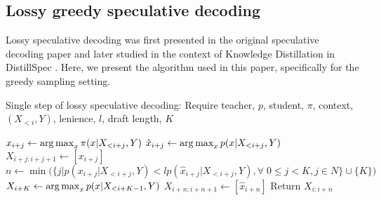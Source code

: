 \subsection{Lossy greedy speculative decoding}

Lossy speculative decoding was first presented in the original speculative decoding paper \cite{leviathan2023fast} and later studied in the context of Knowledge Distillation in DistillSpec \cite{DistllSpec}. Here, we present the algorithm used in this paper, specifically for the greedy sampling setting.

\begin{algorithm}[h!]
\caption{Single step of lossy speculative decoding: Require teacher, $p$, student, $\pi$, context, $(X_{<i}, Y)$, lenience, $l$, draft length, $K$}
\begin{algorithmic}[1]
        \State $x_{i+j} \gets \operatorname*{arg\,max}_{x} \pi(x|X_{<i + j}, Y)$
        \State $\hat{x}_{i + j} \gets \operatorname*{arg\,max}_{x} p(x|X_{<i + j}, Y)$
        \State $X_{i + j: i + j + 1} \gets [x_{i + j}]$
    \EndFor
    \State $n \gets \min \Big(\{j | p(x_{i + j}|X_{<i + j}, Y) < l p(\hat{x}_{i + j}|X_{<i + j}, Y), \forall\;0 \leq j < K, j \in N\} \cup \{K\}\Big)$
    \State $X_{i + K} \gets \operatorname*{arg\,max}_{x} p(x|X_{<i + K - 1}, Y)$
    \Else
    \State $X_{i + n: i + n + 1} \gets [\hat{x}_{i + n}]$
    \EndIf
    \State Return {$X_{i:i + n}$}
\end{algorithmic}
\end{algorithm}